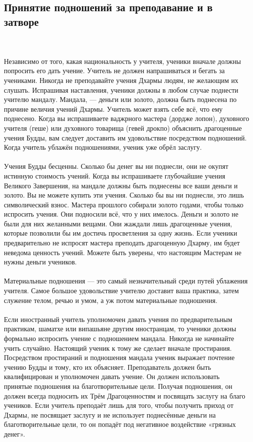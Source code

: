 \subsection{Принятие подношений за преподавание и в затворе}
\\ \\ Независимо от того, какая национальность у учителя, ученики вначале должны попросить его дать учение. Учитель не должен напрашиваться и бегать за учениками. Никогда не преподавайте учения Дхармы людям, не желающим их слушать. Испрашивая наставления, ученики должны в любом случае поднести учителю мандалу. Мандала, — деньги или золото, должна быть поднесена по причине величия учений Дхармы. Учитель может взять себе всё, что ему поднесено. Когда вы испрашиваете ваджрного мастера (дордже лопон), духовного учителя (геше) или духовного товарища (гевей дрокпо) объяснить драгоценные учения Будды, вам следует доставить им удовольствие посредством подношений. Когда учитель ублажён подношениями, ученик уже обрёл заслугу.
\\ \\ Учения Будды бесценны. Сколько бы денег вы ни поднесли, они не окупят истинную стоимость учений. Когда вы испрашиваете глубочайшие учения Великого Завершения, на мандале должны быть поднесены все ваши деньги и золото. Вы не можете купить эти учения. Сколько бы вы ни поднесли, это лишь символический взнос. Мастера прошлого собирали золото годами, чтобы только испросить учения. Они подносили всё, что у них имелось. Деньги и золото не были для них желанными вещами. Они жаждали лишь драгоценные учения, которые позволили бы им достичь просветления за одну жизнь. Если ученики предварительно не испросят мастера преподать драгоценную Дхарму, им будет неведома ценность учений. Можете быть уверены, что настоящим Мастерам не нужны деньги учеников.
\\ \\ Материальные подношения — это самый незначительный среди путей ублажения учителя. Самое большое удовольствие учителю доставит ваша практика, затем служение телом, речью и умом, а уж потом материальные подношения.
\\ \\ Если иностранный учитель уполномочен давать учения по предварительным практикам, шаматхе или випашьяне другим иностранцам, то ученики должны формально испросить учение с подношением мандала. Никогда не начинайте учить случайно. Настоящий ученик к тому же сделает вначале простирания. Посредством простираний и подношения мандала ученик выражает почтение учению Будды и тому, кто их объясняет. Преподаватель должен быть квалифицирован и уполномочен давать учение. Он должен использовать принятые подношения на благотворительные цели. Получая подношения, он должен всегда подносить их Трём Драгоценностям и посвящать заслугу на благо учеников. Если учитель преподаёт лишь для того, чтобы получить приход от Дхармы, не посвящает заслугу и не использует поднесённые деньги на благотворительные цели, то он попадёт под негативное воздействие «грязных денег».
